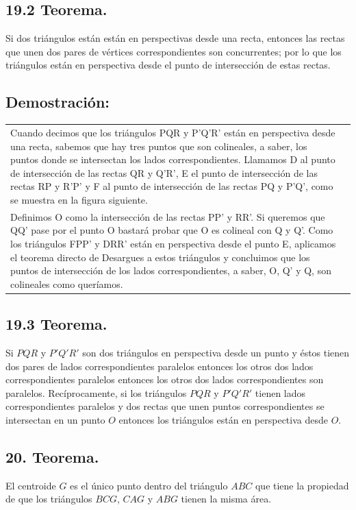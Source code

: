 \documentclass[12pt,a4paper]{article}
\begin{document}
\subsection*{19.2 Teorema.}
Si dos triángulos están están en perspectivas desde una recta, entonces las rectas que unen dos pares de vértices correspondientes son concurrentes; por lo que los triángulos están en perspectiva desde el punto de intersección de estas rectas.
\subsection*{Demostración:}
\begin{tabular}{p{15.9 cm} p{1cm}}
Cuando decimos que los triángulos PQR y P'Q'R' están en perspectiva desde una recta, sabemos que hay tres puntos que son colineales, a saber, los puntos donde se intersectan los lados correspondientes. Llamamos D al punto de intersección de las rectas QR y Q'R', E el punto de intersección de las rectas RP y R'P' y F al punto de intersección de las rectas PQ y P'Q', como se muestra en la figura siguiente.
\\Definimos O como la intersección de las rectas PP' y RR'. Si queremos que QQ' pase por el punto O bastará probar que O es colineal con Q y Q'. Como los triángulos FPP' y DRR' están en perspectiva desde el punto E, aplicamos el teorema directo de Desargues a estos triángulos y concluimos que los puntos de intersección de los lados correspondientes, a saber, O, Q' y Q, son colineales como queríamos.
\end{tabular}
\subsection*{19.3 Teorema.}
Si $PQR$ y $P'Q'R'$ son dos triángulos  en perspectiva desde un punto y éstos tienen dos pares de lados correspondientes paralelos entonces los otros dos lados correspondientes paralelos entonces los otros dos lados correspondientes son paralelos. Recíprocamente, si los triángulos $PQR$ y $P'Q'R'$ tienen lados correspondientes paralelos y dos rectas que unen puntos correspondientes se intersectan en un punto $O$ entonces los triángulos están en perspectiva desde $O$.
\subsection*{20. Teorema.}
El centroide $G$ es el único punto dentro del triángulo $ABC$ que tiene la propiedad de que los triángulos $BCG$, $CAG$ y $ABG$ tienen la misma área.
\end{document}
